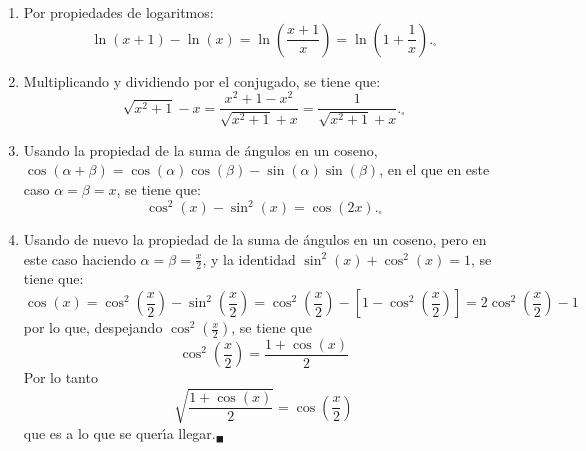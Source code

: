 \begin{solucion}
 $\phantom{0}$
 \begin{enumerate}
  \item Por propiedades de logaritmos:
  \begin{equation*}
   \ln(x+1) - \ln(x) = \ln\left( \frac{x+1}{x} \right) = \ln\left(1 + \frac{1}{x} \right)._{\square}
  \end{equation*}
  
  \item Multiplicando y dividiendo por el conjugado, se tiene que:
  \begin{equation*}
   \sqrt{x^2 + 1} - x = \frac{x^2 + 1 - x^2}{\sqrt{x^2 + 1} + x} = \frac{1}{\sqrt{x^2 + 1} + x}._{\square}
  \end{equation*}

  \item Usando la propiedad de la suma de \'angulos en un coseno, $\cos(\alpha+\beta) = \cos(\alpha)\cos(\beta) - \sin(\alpha)\sin(\beta)$, en el que en este caso $\alpha=\beta=x$, se tiene que:
  \begin{equation*}
   \cos^2(x) - \sin^2(x) = \cos\left(2x\right)._{\square}
  \end{equation*}

  \item Usando de nuevo la propiedad de la suma de \'angulos en un coseno, pero en este caso haciendo $\alpha = \beta = \frac{x}{2}$, y la identidad $\sin^2(x) + \cos^2(x) = 1$, se tiene que:
  \begin{equation*}
   \cos(x) = \cos^2\left( \frac{x}{2} \right) - \sin^2 \left( \frac{x}{2} \right) = \cos^2\left( \frac{x}{2} \right) - \left[ 1 - \cos^2\left( \frac{x}{2} \right) \right] = 2\cos^2\left( \frac{x}{2} \right) - 1
  \end{equation*}
  por lo que, despejando $\cos^2\left( \frac{x}{2} \right)$, se tiene que
  \begin{equation*}
   \cos^2\left( \frac{x}{2} \right) = \frac{1+\cos(x)}{2}
  \end{equation*}
  Por lo tanto
  \begin{equation*}
   \sqrt{\frac{1+\cos(x)}{2}} = \cos\left( \frac{x}{2} \right)
  \end{equation*}
  que es a lo que se quer\'{\i}a llegar.${}_{\blacksquare}$
 \end{enumerate}

\end{solucion}
